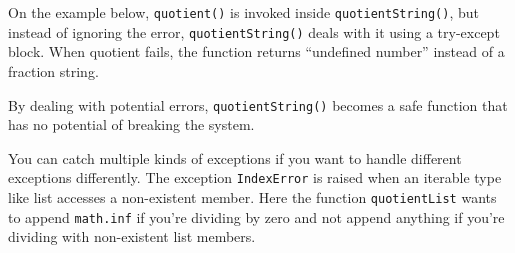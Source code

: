 On the example below, \texttt{quotient()} is invoked inside
\texttt{quotientString()}, but instead of ignoring the error,
\texttt{quotientString()} deals with it using a try-except block. When
quotient fails, the function returns ``undefined number'' instead of a
fraction string.

\begin{Shaded}
\begin{Highlighting}[]
\NormalTok{) }\OperatorTok{{-}\textgreater{}} \NormalTok{: }
    \NormalTok{:}
\OperatorTok{=}
\OperatorTok{=}\OperatorTok{{-}}
         \OperatorTok{+}  \OperatorTok{+} 
     \NormalTok{:}
         
\NormalTok{,}\NormalTok{))}
\NormalTok{,}\NormalTok{))}
\NormalTok{,}\NormalTok{))}
\end{Highlighting}
\end{Shaded}

\begin{Shaded}
\begin{Highlighting}[]
  
  
\end{Highlighting}
\end{Shaded}

By dealing with potential errors, \texttt{quotientString()} becomes a
safe function that has no potential of breaking the system.

You can catch multiple kinds of exceptions if you want to handle
different exceptions differently. The exception \texttt{IndexError} is
raised when an iterable type like list accesses a non-existent member.
Here the function \texttt{quotientList} wants to append
\texttt{math.inf} if you're dividing by zero and not append anything if
you're dividing with non-existent list members.

